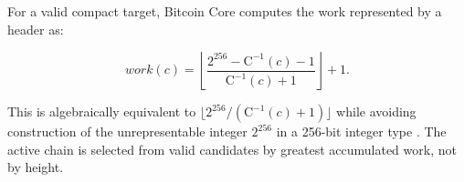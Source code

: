 For a valid compact target, Bitcoin Core computes the work represented by a
header as:

\[
  work(c) =
  \left\lfloor \frac{2^{256}-\mathrm{C}^{-1}(c)-1}{\mathrm{C}^{-1}(c)+1} \right\rfloor + 1.
\]

This is algebraically equivalent to \(\lfloor 2^{256}/(\mathrm{C}^{-1}(c)+1) \rfloor\) while
avoiding construction of the unrepresentable integer $2^{256}$ in a 256-bit
integer type \cite{bitcoin-core-v31}. The active chain is selected from
valid candidates by greatest accumulated work, not by height.
